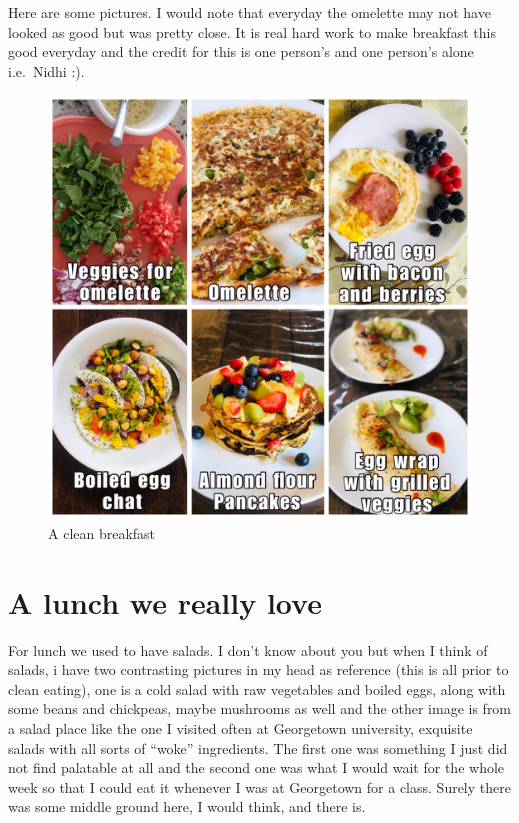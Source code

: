 \documentclass[
  oneside]{book}
\begin{document}
Here are some pictures. I would note that everyday the omelette may not have looked as good but was pretty close. It is real hard work to make breakfast this good everyday and the credit for this is one person's and one person's alone i.e.~Nidhi :).

\begin{figure}
\centering
\includegraphics{pictures/breakfast.JPG}
\caption{A clean breakfast}
\end{figure}

\pagebreak

\hypertarget{a-lunch-we-really-love}{%
\section{A lunch we really love}\label{a-lunch-we-really-love}}

For lunch we used to have salads. I don't know about you but when I think of salads, i have two contrasting pictures in my head as reference (this is all prior to clean eating), one is a cold salad with raw vegetables and boiled eggs, along with some beans and chickpeas, maybe mushrooms as well and the other image is from a salad place like the one I visited often at Georgetown university, exquisite salads with all sorts of ``woke'' ingredients. The first one was something I just did not find palatable at all and the second one was what I would wait for the whole week so that I could eat it whenever I was at Georgetown for a class. Surely there was some middle ground here, I would think, and there is.
\end{document}
